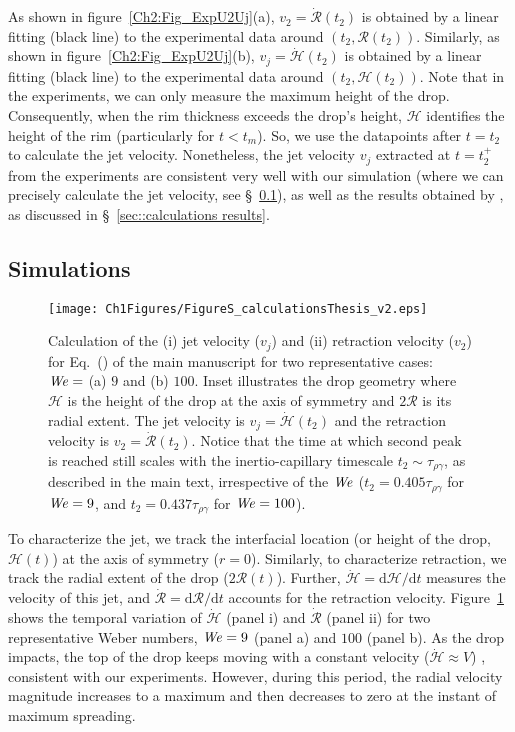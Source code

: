 \begin{subappendices}
	As shown in figure~\ref{Ch2:Fig_ExpU2Uj}(a), $v_2= \dot{\mathcal{R}}(t_2)$ is obtained by a linear fitting (black line) to the experimental data around $(t_2, \mathcal{R}(t_2))$. Similarly, as shown in figure~\ref{Ch2:Fig_ExpU2Uj}(b), $v_j = \dot{\mathcal{H}}(t_2)$ is obtained by a linear fitting (black line) to the experimental data around $(t_2, \mathcal{H}(t_2))$. Note that in the experiments, we can only measure the maximum height of the drop. Consequently, when the rim thickness exceeds the drop's height, $\mathcal{H}$ identifies the height of the rim (particularly for $t < t_m$). So, we use the datapoints after $t = t_2$ to calculate the jet velocity. Nonetheless, the jet velocity $v_j$ extracted at $t = t_2^{+}$ from the experiments are consistent very well with our simulation (where we can precisely calculate the jet velocity, see \S~\ref{sec::calculations Sim}), as well as the results obtained by \citet{bartolo2006singular}, as discussed in \S~\ref{sec::calculations results}.
	
	
	\subsection{Simulations}
	\label{sec::calculations Sim}
	
	\begin{sidewaysfigure}
		\texttt{[image: Ch1Figures/FigureS\_calculationsThesis\_v2.eps]}
		\caption{Calculation of the (i) jet velocity ($v_j$) and (ii) retraction velocity ($v_2$) for Eq.~() of the main manuscript for two representative cases: $\mathit{We} =$ (a) $9$ and (b) $100$. Inset illustrates the drop geometry where $\mathcal{H}$ is the height of the drop at the axis of symmetry and $2\mathcal{R}$ is its radial extent. The jet velocity is $v_j = \dot{\mathcal{H}}(t_2)$ and the retraction velocity is $v_2 = \dot{\mathcal{R}}(t_2)$. Notice that the time at which second peak is reached still scales with the inertio-capillary timescale $t_2 \sim \tau_{\rho\gamma}$, as described in the main text, irrespective of the $\mathit{We}$ ($t_2 = 0.405\tau_{\rho\gamma}$ for $\mathit{We} = 9$, and $t_2 = 0.437\tau_{\rho\gamma}$ for $\mathit{We} = 100$).}
		\label{Ch2:Fig_calculations}
	\end{sidewaysfigure}

	To characterize the jet, we track the interfacial location (or height of the drop, $\mathcal{H}(t)$) at the axis of symmetry ($r = 0$). Similarly, to characterize retraction, we track the radial extent of the drop ($2\mathcal{R}(t)$). Further, $\dot{\mathcal{H}} = \mathrm{d}\mathcal{H}/\mathrm{d}t$ measures the velocity of this jet, and $\dot{\mathcal{R}} = \mathrm{d}\mathcal{R}/\mathrm{d}t$ accounts for the retraction velocity. Figure~\ref{Ch2:Fig_calculations} shows the temporal variation of $\dot{\mathcal{H}}$ (panel i) and $\dot{\mathcal{R}}$ (panel ii) for two representative Weber numbers, $\mathit{We} = 9$ (panel a) and $100$ (panel b). As the drop impacts, the top of the drop keeps moving with a constant velocity ($\dot{\mathcal{H}} \approx V$) \cite{eggers2010drop, Gordillo2018}, consistent with our experiments. However, during this period, the radial velocity magnitude increases to a maximum and then decreases to zero at the instant of maximum spreading. 
	

\end{subappendices}
